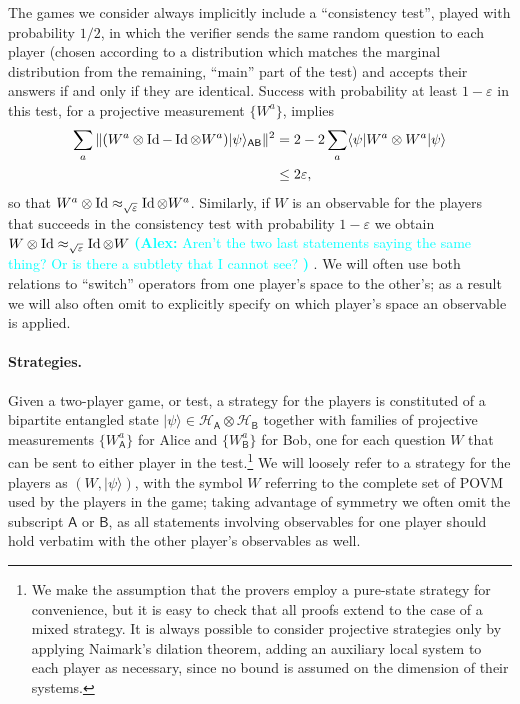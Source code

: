 \documentclass[11pt]{article}
\theoremstyle{remark}
\theoremstyle{definition}
\newcommand{\ket}[1]{|#1\rangle}
\newcommand{\bra}[1]{\langle#1|}
\newcommand{\Id}{\ensuremath{\mathop{\rm Id}\nolimits}}
\newcommand{\reg}[1]{{\textsf{#1}}}
\newcommand{\mH}{\mathcal{H}}
\newcommand{\eps}{\varepsilon}
\newcommand{\agnote}[1]{\textcolor{cyan}{\small {\textbf{(Alex:} #1 \textbf{) }}}}
\begin{document}
The games we consider always implicitly include a ``consistency test'', played with probability $1/2$, in which the verifier sends the same random question to each player (chosen according to a distribution which matches the marginal distribution from the remaining, ``main'' part of the test) and accepts their answers if and only if they are identical. Success with probability at least $1-\eps$ in this test, for a projective measurement $\{W^a\}$, implies 
\begin{align*}
\sum_a \|(W^a \otimes \Id - \Id \otimes W^a)\ket{\psi}_{\reg{AB}}\|^2 &= 2-2 \sum_a \bra{\psi} W^a \otimes W^a \ket{\psi} \\ 
&\leq 2 \eps,
\end{align*}
so that $W^a \otimes \Id \approx_{\sqrt{\eps}} \Id \otimes W^a$. Similarly, if $W$ is an observable for the players that succeeds in the consistency test with probability $1-\eps$ we obtain $W\otimes \Id \approx_{\sqrt{\eps}} \Id \otimes W$ \agnote{Aren't the two last statements saying the same thing? Or is there a subtlety that I cannot see?}. We will often use both relations to ``switch'' operators from one player's space to the other's; as a result we will also often omit to  explicitly specify on which player's space an observable is applied. 

\paragraph{Strategies.} Given a two-player game, or test, a strategy for the players is constituted of a bipartite entangled state $\ket{\psi} \in \mH_\reg{A} \otimes \mH_\reg{B}$ together with families of projective  measurements $\{W^a_\reg{A}\}$ for Alice and $\{W_\reg{B}^a\}$ for Bob, one for each question $W$ that can be sent to either player in the test.\footnote{We make the assumption that the provers employ a pure-state strategy for convenience, but it is easy to check that all proofs extend to the case of a mixed strategy. It is always possible to consider projective strategies only by applying Naimark's dilation theorem, adding an auxiliary local system to each player as necessary, since no bound is assumed on the dimension of their systems.}  %
We will loosely refer to a strategy for the players as $(W,\ket{\psi})$, with the symbol $W$ referring to the complete set of POVM used by the players in the game; taking advantage of  symmetry we often omit the subscript $\reg{A}$ or $\reg{B}$, as all statements involving observables for one player should hold verbatim with the other player's observables as well. 
\end{document}
